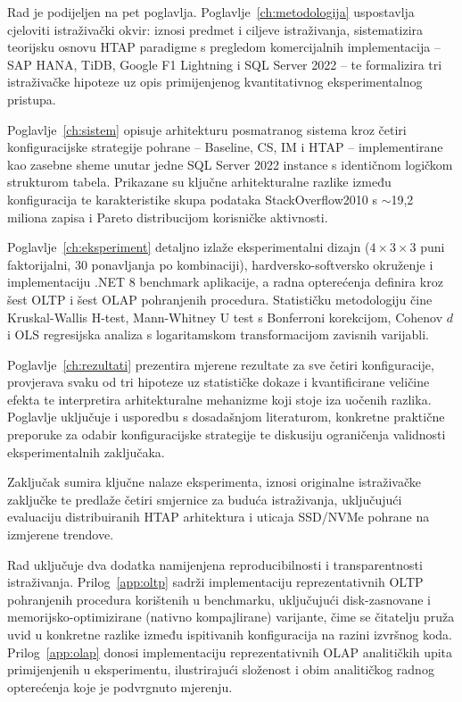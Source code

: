 Rad je podijeljen na pet poglavlja. Poglavlje~\ref{ch:metodologija} uspostavlja cjeloviti istraživački okvir: iznosi predmet i ciljeve istraživanja, sistematizira teorijsku osnovu HTAP paradigme s pregledom komercijalnih implementacija -- SAP HANA, TiDB, Google F1 Lightning i SQL Server 2022 -- te formalizira tri istraživačke hipoteze uz opis primijenjenog kvantitativnog eksperimentalnog pristupa.

Poglavlje~\ref{ch:sistem} opisuje arhitekturu posmatranog sistema kroz četiri konfiguracijske strategije pohrane -- Baseline, CS, IM i HTAP -- implementirane kao zasebne sheme unutar jedne SQL Server 2022 instance s identičnom logičkom strukturom tabela. Prikazane su ključne arhitekturalne razlike između konfiguracija te karakteristike skupa podataka StackOverflow2010 s $\sim$19,2 miliona zapisa i Pareto distribucijom korisničke aktivnosti.

Poglavlje~\ref{ch:eksperiment} detaljno izlaže eksperimentalni dizajn ($4\times3\times3$ puni faktorijalni, 30 ponavljanja po kombinaciji), hardversko-softversko okruženje i implementaciju .NET 8 benchmark aplikacije, a radna opterećenja definira kroz šest OLTP i šest OLAP pohranjenih procedura. Statističku metodologiju čine Kruskal-Wallis H-test, Mann-Whitney U test s Bonferroni korekcijom, Cohenov $d$ i OLS regresijska analiza s logaritamskom transformacijom zavisnih varijabli.

Poglavlje~\ref{ch:rezultati} prezentira mjerene rezultate za sve četiri konfiguracije, provjerava svaku od tri hipoteze uz statističke dokaze i kvantificirane veličine efekta te interpretira arhitekturalne mehanizme koji stoje iza uočenih razlika. Poglavlje uključuje i usporedbu s dosadašnjom literaturom, konkretne praktične preporuke za odabir konfiguracijske strategije te diskusiju ograničenja validnosti eksperimentalnih zaključaka.

Zaključak sumira ključne nalaze eksperimenta, iznosi originalne istraživačke zaključke te predlaže četiri smjernice za buduća istraživanja, uključujući evaluaciju distribuiranih HTAP arhitektura i uticaja SSD/NVMe pohrane na izmjerene trendove.

Rad uključuje dva dodatka namijenjena reproducibilnosti i transparentnosti istraživanja. Prilog~\ref{app:oltp} sadrži implementaciju reprezentativnih OLTP pohranjenih procedura korištenih u benchmarku, uključujući disk-zasnovane i memorijsko-optimizirane (nativno kompajlirane) varijante, čime se čitatelju pruža uvid u konkretne razlike između ispitivanih konfiguracija na razini izvršnog koda. Prilog~\ref{app:olap} donosi implementaciju reprezentativnih OLAP analitičkih upita primijenjenih u eksperimentu, ilustrirajući složenost i obim analitičkog radnog opterećenja koje je podvrgnuto mjerenju.
